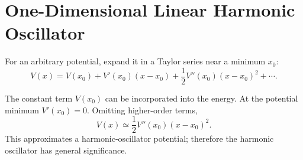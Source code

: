 \section{One-Dimensional Linear Harmonic Oscillator}
For an arbitrary potential, expand it in a Taylor series near a minimum $x_0$:
\begin{equation}
V(x)=V(x_0)+V'(x_0)(x-x_0)+\frac12V''(x_0)(x-x_0)^2+\cdots.
\end{equation}
\begin{center}
\end{center}
The constant term $V(x_0)$ can be incorporated into the energy. At the potential minimum $V'(x_0)=0$. Omitting higher-order terms,
\begin{equation}
V(x)\simeq\frac12V''(x_0)(x-x_0)^2.
\end{equation}
This approximates a harmonic-oscillator potential; therefore the harmonic oscillator has general significance.

